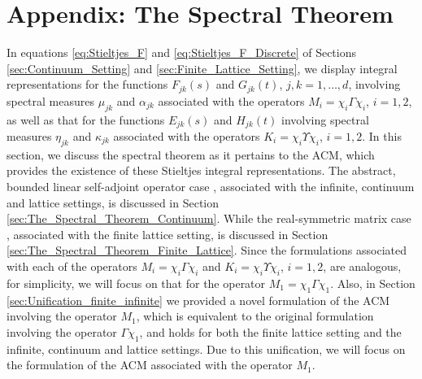 \documentclass{cmslatex}
\begin{document}
\section{Appendix: The Spectral Theorem} 
\label{sec:The_Spectral_Theorem}
%
In equations \eqref{eq:Stieltjes_F} and
\eqref{eq:Stieltjes_F_Discrete} of Sections 
\ref{sec:Continuum_Setting} and \ref{sec:Finite_Lattice_Setting},
we display integral 
representations for the functions $F_{jk}(s)$ and
$G_{jk}(t)$, $j,k=1,\ldots,d$, involving spectral measures $\mu_{jk}$ and
$\alpha_{jk}$ associated with the operators $M_i=\chi_i\Gamma\chi_i$, $i=1,2$, as
well as that for the functions 
$E_{jk}(s)$ and $H_{jk}(t)$ involving spectral measures $\eta_{jk}$ and
$\kappa_{jk}$ associated with the operators $K_i=\chi_i\Upsilon\chi_i$, $i=1,2$. In this section, we
discuss the spectral theorem as it pertains to the ACM, which
provides the existence of these Stieltjes integral representations. The abstract,
bounded linear self-adjoint operator case \cite{Reed-1980,Stone:64},
associated with the infinite, continuum and lattice settings, is
discussed in Section \ref{sec:The_Spectral_Theorem_Continuum}. While
the real-symmetric matrix case
\cite{Halmos-1958,Kreyszig:JWS-1989,Stakgold:BVP:2000}, associated with
the finite lattice setting, is discussed in Section
\ref{sec:The_Spectral_Theorem_Finite_Lattice}. Since the formulations
associated with each of the operators $M_i=\chi_i\Gamma\chi_i$ and $K_i=\chi_i\Upsilon\chi_i$,
$i=1,2$, are analogous, for simplicity, we will focus on that for the
operator $M_1=\chi_1\Gamma\chi_1$. Also, in Section
\ref{sec:Unification_finite_infinite} we provided a novel formulation
of the ACM involving the operator $M_1$, which is 
equivalent to the original formulation 
\cite{Golden:CMP-473,Bruno:PRSLA-353} involving the operator $\Gamma\chi_1$, and holds for
both the finite lattice setting and the infinite, continuum and lattice
settings. Due to this unification, we will focus on the formulation
of the ACM associated with the operator $M_1$. 
%
\end{document}
